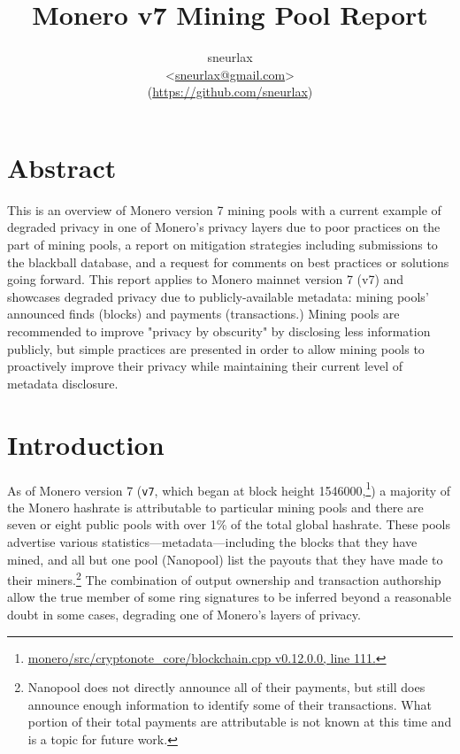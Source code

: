 \documentclass[notitlepage]{report}
\title{Monero v7 Mining Pool Report}
\author{sneurlax \\
\textless\url{sneurlax@gmail.com}\textgreater \\
(\url{https://github.com/sneurlax})}
\begin{document}
\maketitle
\thispagestyle{empty}

\section*{Abstract}

This is an overview of Monero version 7 mining pools with a current example of degraded privacy in one of Monero's privacy layers due to poor practices on the part of mining pools, a report on mitigation strategies including submissions to the blackball database, and a request for comments on best practices or solutions going forward.  This report applies to Monero mainnet version 7 (v7) and showcases degraded privacy due to publicly-available metadata: mining pools' announced finds (blocks) and payments (transactions.)  Mining pools are recommended to improve "privacy by obscurity" by disclosing less information publicly, but simple practices are presented in order to allow mining pools to proactively improve their privacy while maintaining their current level of metadata disclosure.

\clearpage

\tableofcontents

\section{Introduction}

\setcounter{page}{1}

As of Monero version 7 (\verb/v7/, which began at block height 1546000,\footnote{\href{https://github.com/monero-project/monero/blob/93e76e14a205a84cbea8ab0a3e35f37bf9d08b42/src/cryptonote_core/blockchain.cpp\#L111}{monero/src/cryptonote\_core/blockchain.cpp v0.12.0.0, line 111.}}) a majority of the Monero hashrate is attributable to particular mining pools and there are seven or eight public pools with over 1\% of the total global hashrate.  These pools advertise various statistics---metadata---including the blocks that they have mined, and all but one pool (Nanopool) list the payouts that they have made to their miners.\footnote{Nanopool does not directly announce all of their payments, but still does announce enough information to identify some of their transactions.  What portion of their total payments are attributable is not known at this time and is a topic for future work.}  The combination of output ownership and transaction authorship allow the true member of some ring signatures to be inferred beyond a reasonable doubt in some cases, degrading one of Monero's layers of privacy.
\end{document}
